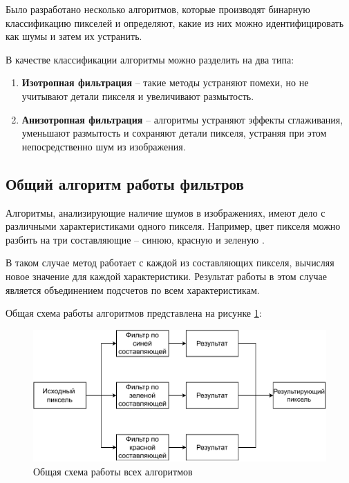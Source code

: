 Было разработано несколько алгоритмов, которые производят бинарную классификацию пикселей и определяют, какие из них можно идентифицировать как шумы и затем их устранить.

В качестве классификации алгоритмы можно разделить на два типа:
\begin{enumerate}
	\item \textbf{Изотропная фильтрация} -- такие методы устраняют помехи, но не учитывают детали пикселя и увеличивают размытость.
	\item \textbf{Анизотропная фильтрация} -- алгоритмы устраняют эффекты сглаживания, уменьшают размытость и сохраняют детали пикселя, устраняя при этом непосредственно шум из изображения.
\end{enumerate}


\subsection{Общий алгоритм работы фильтров}
Алгоритмы, анализирующие наличие шумов в изображениях, имеют дело с различными характеристиками одного пикселя.
Например, цвет пикселя можно разбить на три составляющие -- синюю, красную и зеленую \cite{color}. 

В таком случае метод работает с каждой из составляющих пикселя, вычисляя новое значение для каждой характеристики.
Результат работы в этом случае является объединением подсчетов по всем характеристикам.

\newpage
Общая схема работы алгоритмов представлена на рисунке \ref{fig::allAlgs}:
\FloatBarrier
 \begin{figure}[h]	
 	\begin{center}
 		\includegraphics[width=\linewidth]{inc/pdf/allAlgs.pdf}
 	\end{center}
 	\captionsetup{justification=centering}
 	\caption{Общая схема работы всех алгоритмов}
 	\label{fig::allAlgs}
 \end{figure}
\FloatBarrier

